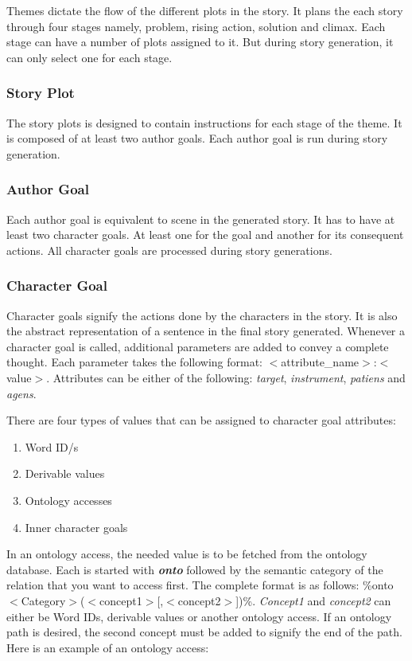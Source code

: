 Themes dictate the flow of the different plots in the story. It plans the each story through four stages namely, problem, rising action, solution and climax. Each stage can have a number of plots assigned to it. But during story generation, it can only select one for each stage.

\subsubsection*{Story Plot}

The story plots is designed to contain instructions for each stage of the theme. It is composed of at least two author goals. Each author goal is run during story generation.

\subsubsection*{Author Goal}

Each author goal is equivalent to scene in the generated story. It has to have at least two character goals. At least one for the goal and another for its consequent actions. All character goals are processed during story generations.

\subsubsection*{Character Goal}

Character goals signify the actions done by the characters in the story. It is also the abstract representation of a sentence in the final story generated. Whenever a character goal is called, additional parameters are added to convey a complete thought. Each parameter takes the following format: $<$attribute\_name$>$:$<$value$>$. Attributes can be either of the following: \textit{target}, \textit{instrument}, \textit{patiens} and \textit{agens}. 

There are four types of values that can be assigned to character goal attributes:
\begin{enumerate}
\item Word ID/s
\item Derivable values
\item Ontology accesses
\item Inner character goals
\end{enumerate}

In an ontology access, the needed value is to be fetched from the ontology database. Each is started with \textit{\textbf{onto}} followed by the semantic category of the relation that you want to access first. The complete format is as follows: \%onto$<$Category$>$($<$concept1$>$[,$<$concept2$>$])\%. \textit{Concept1} and \textit{concept2} can either be Word IDs, derivable values or another ontology access. If an ontology path is desired, the second concept must be added to signify the end of the path. Here is an example of an ontology access:

